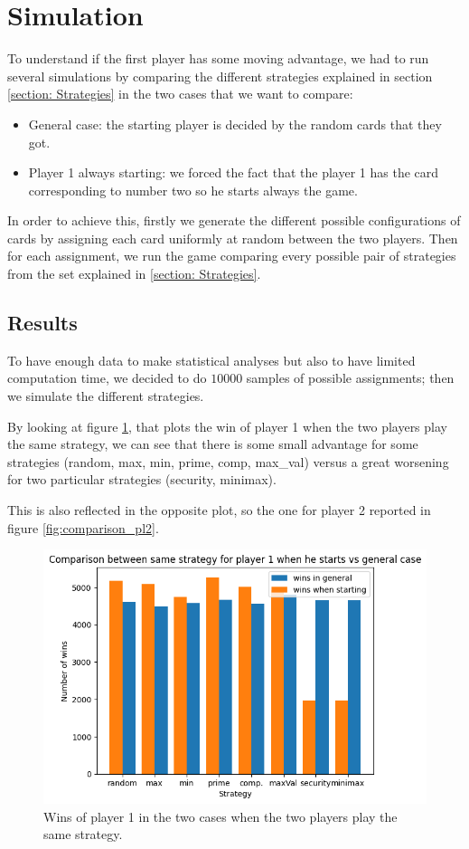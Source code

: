 \section{Simulation} \label{section:Simulation} %
To understand if the first player has some moving advantage, we had to run several simulations by comparing the different strategies explained in section \ref{section: Strategies} in the two cases that we want to compare:
\begin{itemize}
    \item General case: the starting player is decided by the random cards that they got.
    \item Player 1 always starting: we forced the fact that the player 1 has the card corresponding to number two so he starts always the game.
\end{itemize}
In order to achieve this, firstly we generate the different possible configurations of cards by assigning each card uniformly at random between the two players. Then for each assignment, we run the game comparing every possible pair of strategies from the set explained in \ref{section: Strategies}.

\subsection{Results} \label{subsection:Results}
To have enough data to make statistical analyses but also to have limited computation time, we decided to do $10 000$ samples of possible assignments; then we simulate the different strategies.


By looking at figure \ref{fig:comparison_pl1}, that plots the win of player 1 when the two players play the same strategy, we can see that there is some small advantage for some strategies (random, max, min, prime, comp, max\_val) versus a great worsening for two particular strategies (security, minimax).

This is also reflected in the opposite plot, so the one for player 2 reported in figure \ref{fig:comparison_pl2}.

\begin{figure}
    \centering
    \includegraphics[width=0.9\linewidth]{img/comparison_winning_starts_general_pl1.png}
    \caption{Wins of player 1 in the two cases when the two players play the same strategy.}
    \label{fig:comparison_pl1}
\end{figure}


